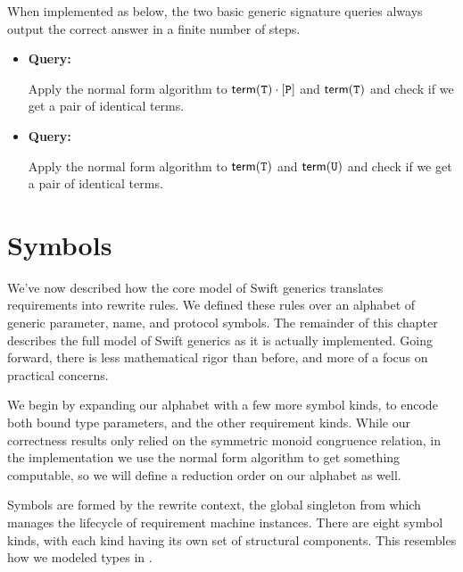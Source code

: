 \documentclass[../generics]{subfiles}
\begin{document}
\begin{mdframed}[leftline=false,rightline=false,linecolor=black,linewidth=2pt]
When implemented as below, the two basic generic signature queries always output the correct answer in a finite number of steps.
\begin{itemize}
\item \textbf{Query:} 

Apply the normal form algorithm to $\mathsf{term}(\texttt{T})\cdot[\texttt{P}]$ and $\mathsf{term}(\texttt{T})$ and check if we get a pair of identical terms.

\item \textbf{Query:} 

Apply the normal form algorithm to $\mathsf{term}(\texttt{T})$ and $\mathsf{term}(\texttt{U})$ and check if we get a pair of identical terms.
\end{itemize}
\end{mdframed}

\section{Symbols}\label{sec:rqm symbols}

We've now described how the core model of Swift generics translates requirements into rewrite rules. We defined these rules over an alphabet of generic parameter, name, and protocol symbols. The remainder of this chapter describes the full model of Swift generics as it is actually implemented. Going forward, there is less mathematical rigor than before, and more of a focus on practical concerns.

We begin by expanding our alphabet with a few more symbol kinds, to encode both bound type parameters, and the other requirement kinds. While our correctness results only relied on the symmetric monoid congruence relation, in the implementation we use the normal form algorithm to get something computable, so we will define a reduction order on our alphabet as well.

Symbols are formed by the rewrite context, the global singleton from  which manages the lifecycle of requirement machine instances. There are eight symbol kinds, with each kind having its own set of structural components. This resembles how we modeled types in .
\end{document}
